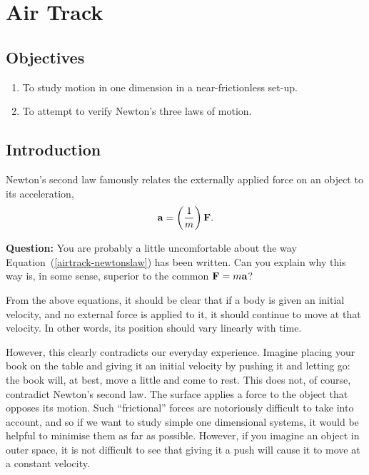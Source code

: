 \chapter{Air Track}

\section*{Objectives}

\begin{enumerate}
\itemsep0em
\item To study motion in one dimension in a near-frictionless set-up.
\item To attempt to verify Newton's three laws of motion.
\end{enumerate}


\section*{Introduction}

Newton's second law famously relates the externally applied force on an object to its acceleration,
\begin{equation}
    \vb{a} = \left(\frac{1}{m}\right) \vb{F}.
    \label{airtrack-newtonslaw}
\end{equation}

\begin{question}
 \textbf{Question:} You are probably a little uncomfortable about the way Equation~(\ref{airtrack-newtonslaw}) has been written. Can you explain why this way is, in some sense, superior to the common $\vb{F}=m\vb{a}$?
\end{question}

 From the above equations, it should be clear that if a body is given an initial velocity, and no external force is applied to it, it should continue to move at that velocity. In other words, its position should vary linearly with time.
 
 However, this clearly contradicts our everyday experience. Imagine placing your book on the table and giving it an initial velocity by pushing it and letting go: the book will, at best, move a little and come to rest. This does not, of course, contradict Newton's second law. The surface applies a force to the object that opposes its motion. Such ``frictional'' forces are notoriously difficult to take into account, and so if we want to study simple one dimensional systems, it would be helpful to minimise them as far as possible. However, if you imagine an object in outer space, it is not difficult to see that giving it a push will cause it to move at a constant velocity.
 
